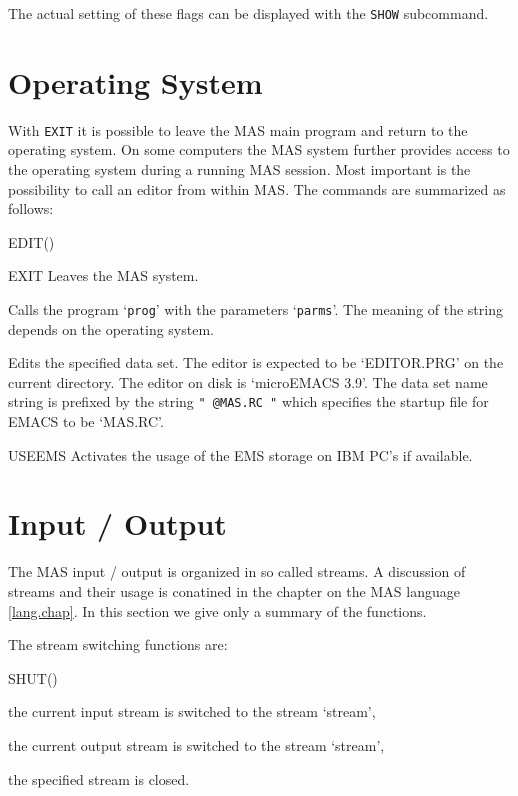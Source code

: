 The actual setting of these flags can be displayed with the 
\verb/SHOW/ subcommand. 


\section{Operating System}

With \verb/EXIT/ it is possible to leave the MAS main program 
and return to the operating system.
On some computers the MAS system further provides
access to the operating system during a running MAS session. 
Most important is the possibility to call an editor
from within MAS. 
The commands are summarized as follows:
\begin{deflist}{EDIT()}
\item[EXIT\index{EXIT}] Leaves the MAS system. 
\item[DOS(\verb*/"prog parms"/)\index{DOS}]  Calls the program 
      `\verb/prog/' with the parameters `\verb/parms/'. 
      The meaning of the string depends on the operating system.
\item[EDIT(\verb*/"data set name"/)\index{EDIT}] Edits 
      the specified data set. 
      The editor is expected to be 
      `EDITOR.PRG' on the current directory. 
      The editor on disk is `microEMACS 3.9'. 
      The data set name string is prefixed by the
      string \verb*/" @MAS.RC "/ which specifies the startup file
      for EMACS to be `MAS.RC'.  
\item[USEEMS\index{USEEMS}] Activates the usage of the EMS storage 
      on IBM PC's if available. 
\end{deflist}


\section{Input / Output}

The MAS input / output is organized in so called streams. 
A discussion of streams and their usage is conatined 
in the chapter on the MAS language \ref{lang.chap}.
In this section we give only a summary of the functions.

The stream switching functions are:
\begin{deflist}{SHUT()}
\item[IN(\verb/"stream"/)\index{IN}] the current input stream 
      is switched to the stream `stream',
\item[OUT(\verb/"stream"/)\index{OUT}] the current output stream 
      is switched to the stream `stream',
\item[SHUT(\verb/"stream"/)\index{SHUT}] the specified stream 
      is closed. 
\end{deflist}

